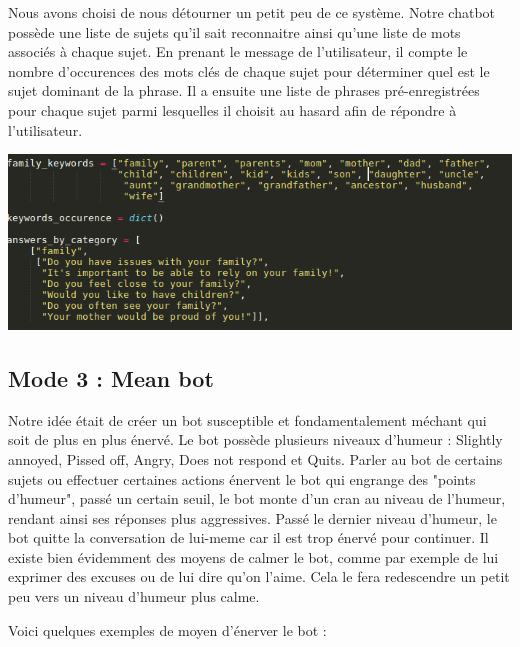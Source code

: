 \documentclass[paper=a4, fontsize=11pt]{article}
\begin{document}
Nous avons choisi de nous détourner un petit peu de ce système. Notre chatbot possède une liste de sujets qu'il sait reconnaitre ainsi qu'une liste de mots associés à chaque sujet. En prenant le message de l'utilisateur, il compte le nombre d'occurences des mots clés de chaque sujet pour déterminer quel est le sujet dominant de la phrase. Il a ensuite une liste de phrases pré-enregistrées pour chaque sujet parmi lesquelles il choisit au hasard afin de répondre à l'utilisateur. 

\begin{center}
\includegraphics[width=500pt]{MeanBot_mode2_keywords.png}
\end{center}

\subsection{Mode 3 : Mean bot}
Notre idée était de créer un bot susceptible et fondamentalement méchant qui soit de plus en plus énervé.
Le bot possède plusieurs niveaux d'humeur : Slightly annoyed, Pissed off, Angry, Does not respond et Quits.
Parler au bot de certains sujets ou effectuer certaines actions énervent le bot qui engrange des "points d'humeur", passé un certain seuil, le bot monte d'un cran au niveau de l'humeur, rendant ainsi ses réponses plus aggressives. Passé le dernier niveau d'humeur, le bot quitte la conversation de lui-meme car il est trop énervé pour continuer.
Il existe bien évidemment des moyens de calmer le bot, comme par exemple de lui exprimer des excuses ou de lui dire qu'on l'aime. Cela le fera redescendre un petit peu vers un niveau d'humeur plus calme.


Voici quelques exemples de moyen d'énerver le bot :
\end{document}
